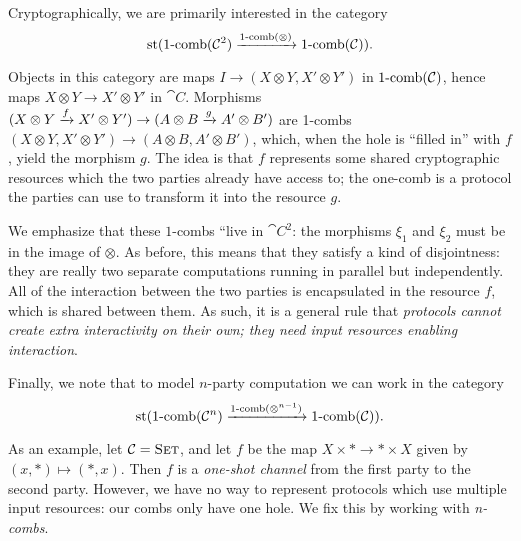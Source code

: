 Cryptographically, we are primarily interested in the category \[
  \operatorname*{st}(\operatorname*{1-comb}({\mathcal{C}}^2)\xrightarrow{\operatorname*{1-comb}(\otimes)}\operatorname*{1-comb}({\mathcal{C}})).
\]

Objects in this category are maps $I\to (X\otimes Y, X'\otimes Y')$ in
$\operatorname*{1-comb}({\mathcal{C}})$, hence maps $X\otimes Y\to X'\otimes Y'$ in $\cat{C}$.
Morphisms $(X\otimes Y\xrightarrow{f} X'\otimes Y')\to(A\otimes B\xrightarrow{g} A'\otimes B')$
are 1-combs $(X\otimes Y, X'\otimes Y')\to (A\otimes B, A'\otimes B')$, which,
when the hole is ``filled in'' with $f$, yield the morphism $g$. The idea is
that $f$ represents some shared cryptographic resources which the two parties
already have access to; the one-comb is a protocol the parties can use to
transform it into the resource $g$.

We emphasize that these $1$-combs ``live in $\cat{C}^2$: the morphisms $\xi_1$
and $\xi_2$ must be in the image of $\otimes$. As before, this means that they
satisfy a kind of disjointness: they are really two separate computations
running in parallel but independently. All of the interaction between the two
parties is encapsulated in the resource $f$, which is shared between them. As
such, it is a general rule that \emph{protocols cannot create extra
  interactivity on their own; they need input resources enabling interaction}.

Finally, we note that to model $n$-party computation we can work in the category \[
  \operatorname*{st}(\operatorname*{1-comb}({\mathcal{C}}^n)\xrightarrow{\operatorname*{1-comb}(\otimes^{n-1})}\operatorname*{1-comb}({\mathcal{C}})).
\]

As an example, let ${\mathcal{C}} = {\textsc{\text{Set}}}$, and let $f$ be the map $X\times *\to
*\times X$ given by $(x, *)\mapsto (*, x)$. Then $f$ is a \emph{one-shot channel}
from the first party to the second party. However, we have no way to represent
protocols which use multiple input resources: our combs only have one hole. We
fix this by working with \emph{n-combs}.



